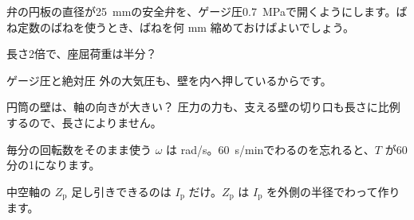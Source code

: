 \begin{jibun}
弁の円板の直径が\qty{25}{mm}の安全弁を、ゲージ圧\qty{0.7}{MPa}で開くようにします。ばね定数のばねを使うとき、ばねを何 mm 縮めておけばよいでしょう。
\end{jibun}

\begin{tsumazuki}{長さ2倍で、座屈荷重は半分？}
\end{tsumazuki}
\begin{tsumazuki}{ゲージ圧と絶対圧}
外の大気圧も、壁を内へ押しているからです。
\end{tsumazuki}
\begin{tsumazuki}{円筒の壁は、軸の向きが大きい？}
圧力の力も、支える壁の切り口も長さに比例するので、長さによりません。
\end{tsumazuki}
\begin{tsumazuki}{毎分の回転数をそのまま使う}
$\omega$ は rad/s。\qty{60}{s/min}でわるのを忘れると、$T$ が60分の1になります。
\end{tsumazuki}
\begin{tsumazuki}{中空軸の $Z_{\mathrm p}$}
足し引きできるのは $I_{\mathrm p}$ だけ。$Z_{\mathrm p}$ は $I_{\mathrm p}$ を外側の半径でわって作ります。
\end{tsumazuki}

